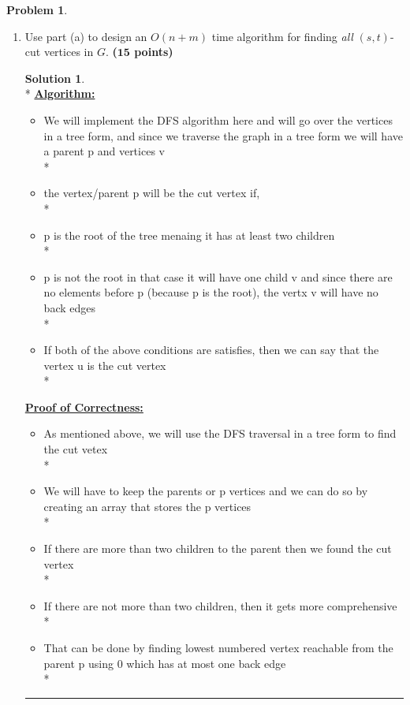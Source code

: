 \documentclass{article}
\theoremstyle{definition}
\newtheorem{problem}{Problem}
\def\fline{\rule{0.75\linewidth}{0.5pt}}
\newcommand{\finishline}{\vspace{-15pt}\begin{center}\fline\end{center}}
\newtheorem*{solution*}{Solution}
\newenvironment{solution}{\begin{solution*}}{{\finishline} \end{solution*}}
\newcommand{\grade}[1]{\hfill{\textbf{($\mathbf{#1}$ points)}}}
\newcommand\tab[1][1cm]{\hspace*{#1}}
\begin{document}
\begin{problem}
\begin{enumerate}[label=(\alph*)]
		\item Use part (a) to design an $O(n+m)$ time algorithm for finding \emph{all} $(s,t)$-cut vertices in $G$.  \grade{15}
		
		\smallskip
		
		\begin{solution}
			\hfill \bigskip\\*
			\textbf{\underline{Algorithm:}} 
				\begin{itemize}
					\item We will implement the DFS algorithm here and will go over the vertices in a tree form, and since we traverse the graph in a tree form we will have a parent p and vertices v \\*
					\item the vertex/parent p will be the cut vertex if,  \\*
					\tab \item[1.] p is the root of the tree menaing it has at least two children  \\*
					\tab \item[2.] p is not the root in that case it will have one child v and since there are no elements before p (because p is the root), the vertx v will have no back edges  \\*
					\item If both of the above conditions are satisfies, then we can say that the vertex u is the cut vertex \\*
				\end{itemize} 
			\textbf{\underline{Proof of Correctness:}}
				\begin{itemize}
					\item As mentioned above, we will use the DFS traversal in a tree form to find the cut vetex \\*
					\item We will have to keep the parents or p vertices and we can do so by creating an array that stores the p vertices \\*
					\item If there are more than two children to the parent then we found the cut vertex \\*
					\item If there are not more than two children, then it gets more comprehensive \\*
					\item That can be done by finding lowest numbered vertex reachable from the parent p using 0 which has at most one back edge \\*

\end{itemize}
\end{solution}
\end{enumerate}
\end{problem}
\end{document}
